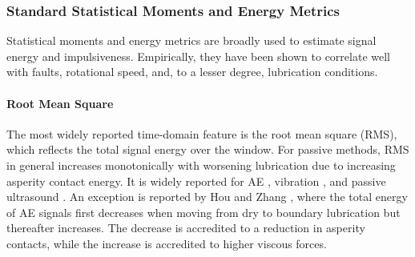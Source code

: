 
\subsubsection{Standard Statistical Moments and Energy Metrics}
\label{subsubsec:moments}
Statistical moments and energy metrics are broadly used to estimate signal energy and impulsiveness. Empirically, they have been shown to correlate well with faults, rotational speed, and, to a lesser degree, lubrication conditions.

\paragraph{Root Mean Square}
The most widely reported time-domain feature is the root mean square (RMS), which reflects the total signal energy over the window. For passive methods, RMS in general increases monotonically with worsening lubrication due to increasing asperity contact energy. It is widely reported for AE \cite{cornel_condition_2021,hou_-situ_2025}, vibration \cite{jakobsen_vibration_2021,jakobsen_detecting_2023,xu_vibration-based_2024}, and passive ultrasound \cite{jakobsen_detecting_2023}. An exception is reported by Hou and Zhang \cite{hou_-situ_2025}, where the total energy of AE signals first decreases when moving from dry to boundary lubrication but thereafter increases. The decrease is accredited to a reduction in asperity contacts, while the increase is accredited to higher viscous forces.

